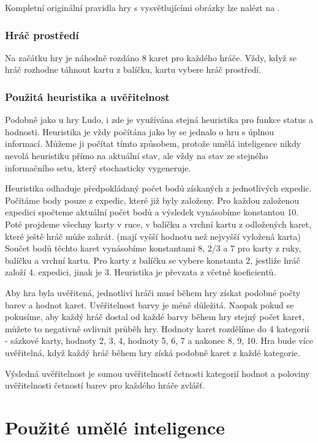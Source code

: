 Kompletní originální pravidla hry s vysvětlujícími obrázky lze nalézt na \cite{ztracmesta}.

\subsubsection{Hráč prostředí}

Na začátku hry je náhodně rozdáno 8 karet pro každého hráče. Vždy, když se hráč rozhodne táhnout kartu z balíčku, kartu vybere hráč prostředí.

\subsubsection{Použitá heuristika a uvěřitelnost}

Podobně jako u hry Ludo, i zde je využívána stejná heuristika pro funkce status a hodnosti. Heuristika je vždy počítána jako by se jednalo o hru s úplnou informací. Můžeme ji počítat tímto způsobem, protože umělá inteligence nikdy nevolá heuristiku přímo na aktuální stav, ale vždy na stav ze stejného informačního setu, který stochasticky vygeneruje.

Heuristika odhaduje předpokládaný počet bodů získaných z jednotlivých expedic. Počítáme body pouze z expedic, které již byly založeny. Pro každou založenou expedici spočteme aktuální počet bodů a výsledek vynásobíme konstantou 10. Poté projdeme všechny karty v ruce, v balíčku a vrchní kartu z odložených karet, které ještě hráč může zahrát. (mají vyšší hodnotu než nejvyšší vyložená karta) Součet bodů těchto karet vynásobíme konstantami 8, 2/3 a 7 pro karty z ruky, balíčku a vrchní kartu. Pro karty z balíčku se vybere konstanta 2, jestliže hráč založí 4. expedici, jinak je 3. Heuristika je převzata z \cite{ch5LT} včetně koeficientů.

Aby hra byla uvěřitená, jednotliví hráči musí během hry získat podobné počty barev a hodnot karet. Uvěřitelnost barvy je méně důležitá. Naopak pokud se pokusíme, aby každý hráč dostal od každé barvy během hry stejný počet karet, můžete to negativně ovlivnit průběh hry. Hodnoty karet rozdělíme do 4 kategorií - sázkové karty, hodnoty 2, 3, 4, hodnoty 5, 6, 7 a nakonec 8, 9, 10. Hra bude více uvěřitelná, když každý hráč během hry získá podobně karet z každé kategorie.

Výsledná uvěřitelnost je sumou uvěřitelností četnosti kategorií hodnot a poloviny uvěřitelnosti četností barev pro každého hráče zvlášť.

\section{Použité umělé inteligence}

